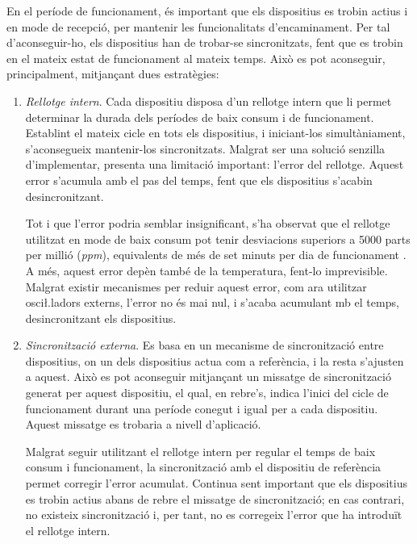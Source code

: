 \documentclass{tfgitic}[2024/07/01]
\begin{document}
{En el període de funcionament, és important que els dispositius es trobin actius i en mode de recepció, per mantenir les funcionalitats d'encaminament. Per tal d'aconseguir-ho, els dispositius han de trobar-se sincronitzats, fent que es trobin en el mateix estat de funcionament al mateix temps. Això es pot aconseguir, principalment, mitjançant dues estratègies:
\begin{enumerate}
    \item \emph{Rellotge intern}. Cada dispositiu disposa d'un rellotge intern que li permet determinar la durada dels períodes de baix consum i de funcionament. Establint el mateix cicle en tots els dispositius, i iniciant-los simultàniament, s'aconsegueix mantenir-los sincronitzats. Malgrat ser una solució senzilla d'implementar, presenta una limitació important: l'error del rellotge. Aquest error s'acumula amb el pas del temps, fent que els dispositius s'acabin desincronitzant.
    
    Tot i que l'error podria semblar insignificant, s'ha observat que el rellotge utilitzat en mode de baix consum pot tenir desviacions superiors a 5000 parts per millió (\emph{ppm}), equivalents de més de set minuts per dia de funcionament \cite{nikki_smith_esp32_2022}. A més, aquest error depèn també de la temperatura, fent-lo imprevisible. Malgrat existir mecanismes per reduir aquest error, com ara utilitzar osci\l.ladors externs, l'error no és mai nul, i s'acaba acumulant mb el temps, desincronitzant els dispositius.
    
    \item \emph{Sincronització externa}. Es basa en un mecanisme de sincronització entre dispositius, on un dels dispositius actua com a referència, i la resta s'ajusten a aquest. Això es pot aconseguir mitjançant un missatge de sincronització generat per aquest dispositiu, el qual, en rebre's, indica l'inici del cicle de funcionament durant una període conegut i igual per a cada dispositiu. Aquest missatge es trobaria a nivell d'aplicació. 
    
    Malgrat seguir utilitzant el rellotge intern per regular el temps de baix consum i funcionament, la sincronització amb el dispositiu de referència permet corregir l'error acumulat. 
    Continua sent important que els dispositius es trobin actius abans de rebre el missatge de sincronització; en cas contrari, no existeix sincronització i, per tant, no es corregeix l'error que ha introduït el rellotge intern.
\end{enumerate}

}
\end{document}

